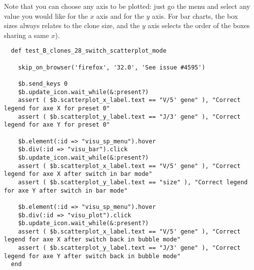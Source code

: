 Note that you can choose any axis to be plotted: just go the  menu and
select any value you would like for the $x$ axis and for the $y$ axis.
For bar charts, the box sizes always relates to the clone size,
and the $y$ axis selects the order of the boxes sharing a same $x$).


\begin{verbatim}
  def test_B_clones_28_switch_scatterplot_mode

    skip_on_browser('firefox', '32.0', 'See issue #4595')

    $b.send_keys 0
    $b.update_icon.wait_while(&:present?)
    assert ( $b.scatterplot_x_label.text == "V/5' gene" ), "Correct legend for axe X for preset 0"
    assert ( $b.scatterplot_y_label.text == "J/3' gene" ), "Correct legend for axe Y for preset 0"

    $b.element(:id => "visu_sp_menu").hover
    $b.div(:id => "visu_bar").click
    $b.update_icon.wait_while(&:present?)
    assert ( $b.scatterplot_x_label.text == "V/5' gene" ), "Correct legend for axe X after switch in bar mode"
    assert ( $b.scatterplot_y_label.text == "size" ), "Correct legend for axe Y after switch in bar mode"

    $b.element(:id => "visu_sp_menu").hover
    $b.div(:id => "visu_plot").click
    $b.update_icon.wait_while(&:present?)
    assert ( $b.scatterplot_x_label.text == "V/5' gene" ), "Correct legend for axe X after switch back in bubble mode"
    assert ( $b.scatterplot_y_label.text == "J/3' gene" ), "Correct legend for axe Y after switch back in bubble mode"
  end
\end{verbatim}


